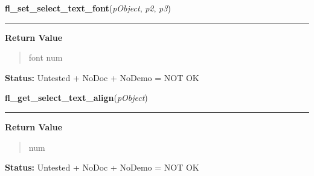     \label{xformslib:library:fl_set_select_text_font}

    \vspace{0.5ex}

\hspace{.8\funcindent}\begin{boxedminipage}{\funcwidth}

    \raggedright \textbf{fl\_set\_select\_text\_font}(\textit{pObject}, \textit{p2}, \textit{p3})

    \vspace{-1.5ex}

    \rule{\textwidth}{0.5\fboxrule}
\setlength{\parskip}{2ex}
\setlength{\parskip}{1ex}
      \textbf{Return Value}
    \vspace{-1ex}

      \begin{quote}
      font num

      \end{quote}

\textbf{Status:} Untested + NoDoc + NoDemo = NOT OK



    \end{boxedminipage}

    \label{xformslib:library:fl_get_select_text_align}

    \vspace{0.5ex}

\hspace{.8\funcindent}\begin{boxedminipage}{\funcwidth}

    \raggedright \textbf{fl\_get\_select\_text\_align}(\textit{pObject})

    \vspace{-1.5ex}

    \rule{\textwidth}{0.5\fboxrule}
\setlength{\parskip}{2ex}
\setlength{\parskip}{1ex}
      \textbf{Return Value}
    \vspace{-1ex}

      \begin{quote}
      num

      \end{quote}

\textbf{Status:} Untested + NoDoc + NoDemo = NOT OK



    \end{boxedminipage}

